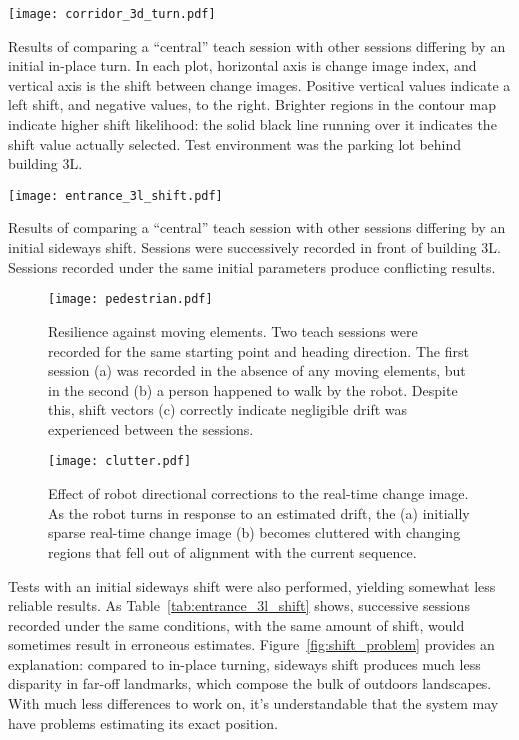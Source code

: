\documentclass[twocolumn, 9pt,fleqn]{jsproceedings}
\begin{document}
\clearpage

\begin{table*}[h!]
\texttt{[image: corridor\_3d\_turn.pdf]}
\caption{Results of comparing a ``central'' teach session with other sessions differing by an initial in-place turn. In each plot, horizontal axis is change image index, and vertical axis is the shift between change images. Positive vertical values indicate a left shift, and negative values, to the right. Brighter regions in the contour map indicate higher shift likelihood: the solid black line running over it indicates the shift value actually selected. Test environment was the parking lot behind building 3L.}
\label{tab:corridor_3d_turn}
\end{table*}

\clearpage

\begin{table*}[h!]
\texttt{[image: entrance\_3l\_shift.pdf]}
\caption{Results of comparing a ``central'' teach session with other sessions differing by an initial sideways shift. Sessions were successively recorded in front of building 3L. Sessions recorded under the same initial parameters produce conflicting results.}
\label{tab:entrance_3l_shift}
\end{table*}

\clearpage

\begin{figure}[h!]
\texttt{[image: pedestrian.pdf]}
\caption{Resilience against moving elements. Two teach sessions were recorded for the same starting point and heading direction. The first session (a) was recorded in the absence of any moving elements, but in the second (b) a person happened to walk by the robot. Despite this, shift vectors (c) correctly indicate negligible drift was experienced between the sessions.}
\label{fig:pedestrian}
\end{figure}

\begin{figure}[h!]
\centering
\texttt{[image: clutter.pdf]}
\caption{Effect of robot directional corrections to the real-time change image. As the robot turns in response to an estimated drift, the (a) initially sparse real-time change image (b) becomes cluttered with changing regions that fell out of alignment with the current sequence.}
\label{fig:clutter}
\end{figure}

Tests with an initial sideways shift were also performed, yielding somewhat less reliable results. As Table~\ref{tab:entrance_3l_shift} shows, successive sessions recorded under the same conditions, with the same amount of shift, would sometimes result in erroneous estimates. Figure~\ref{fig:shift_problem} provides an explanation: compared to in-place turning, sideways shift produces much less disparity in far-off landmarks, which compose the bulk of outdoors landscapes. With much less differences to work on, it's understandable that the system may have problems estimating its exact position.
\end{document}
